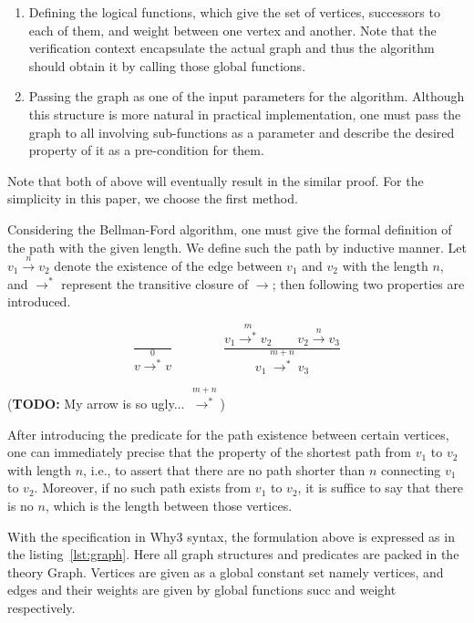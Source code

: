 \documentclass[a4paper,12pt]{article}
\begin{document}
\begin{enumerate}

\item Defining the logical functions, which give the set of vertices, successors to each of them, and weight between one vertex and another. Note that the verification context encapsulate the actual graph and thus the algorithm should obtain it by calling those global functions.

\item Passing the graph as one of the input parameters for the algorithm. Although this structure is more natural in practical implementation, one must pass the graph to all involving sub-functions as a parameter and describe the desired property of it as a pre-condition for them.

\end{enumerate}

Note that both of above will eventually result in the similar proof. For the simplicity in this paper, we choose the first method.

Considering the Bellman-Ford algorithm, one must give the formal definition of the path with the given length. We define such the path by inductive manner. Let $ v_1 \stackrel{n}{\to} v_2 $ denote the existence of the edge between $ v_1 $ and $ v_2 $ with the length $ n $, and $ \to ^* $ represent the transitive closure of $ \to $; then following two properties are introduced.

\begin{displaymath}
  \frac{}
       {v{\stackrel{0}{\to^*}} v}
  \qquad\qquad
  \frac{v_1\stackrel{m}{\to^*}v_2 \qquad v_2\stackrel{n}{\to}v_3}
       {v_1\stackrel{m+n}{\longrightarrow^*}v_3}
\end{displaymath}

(\textbf{TODO:} My arrow is so ugly... $ \stackrel{m+n}{\longrightarrow^*} $)

After introducing the predicate for the path existence between certain vertices, one can immediately precise that the property of the shortest path from $ v_1 $ to $ v_2 $ with length $ n $, i.e., to assert that there are no path shorter than $ n $ connecting $ v_1 $ to $ v_2 $. Moreover, if no such path exists from $ v_1 $ to $ v_2 $, it is suffice to say that there is no $ n $, which is the length between those vertices.

With the specification in Why3 syntax, the formulation above is expressed as in the listing~\ref{lst:graph}. Here all graph structures and predicates are packed in the theory \mbox{\sc Graph}. Vertices are given as a global constant set namely \mbox{\sc vertices}, and edges and their weights are given by global functions \mbox{\sc succ} and \mbox{\sc weight} respectively.
\end{document}
